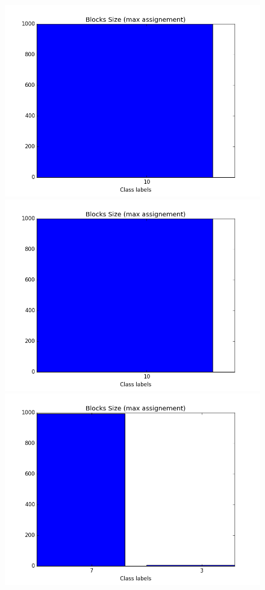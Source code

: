 \begin{figure}[ht]
	\endminipage
		\vspace{-0.28cm}
	\includegraphics[scale=0.27]{img/expe/1_mmsb/figure_3}
	\endminipage
	\includegraphics[scale=0.27]{img/expe/2_mmsb/figure_3} 
	\endminipage
	\includegraphics[scale=0.27]{img/expe/3_mmsb/figure_3}
	\endminipage


\end{figure}
